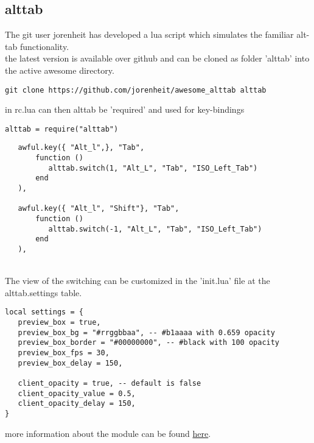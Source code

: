 \subsection{alttab}
	The git user jorenheit has developed a lua script which simulates the familiar alt-tab functionality.\\
	the latest version is available over github and can be cloned as folder 'alttab' into the active awesome directory.
	\begin{lstlisting}
git clone https://github.com/jorenheit/awesome_alttab alttab
	\end{lstlisting}
	
	\noindent in rc.lua can then alttab be 'required' and used for key-bindings
	\begin{lstlisting}
alttab = require("alttab")	
	\end{lstlisting}
	
	\begin{lstlisting}
   awful.key({ "Alt_l",}, "Tab",                                                      
       function ()                                                                              
          alttab.switch(1, "Alt_L", "Tab", "ISO_Left_Tab")                                             
       end                                                                                      
   ),                                                                                           
                                                                                                
   awful.key({ "Alt_l", "Shift"}, "Tab",                                                      
       function ()                                                                              
          alttab.switch(-1, "Alt_L", "Tab", "ISO_Left_Tab")                                            
       end                                                                                      
   ),	
	\end{lstlisting}
	
	\noindent \\The view of the switching can be customized in the 'init.lua' file at the alttab.settings table.
	\begin{lstlisting}
local settings = { 
   preview_box = true,
   preview_box_bg = "#rrggbbaa", -- #b1aaaa with 0.659 opacity
   preview_box_border = "#00000000", -- #black with 100 opacity
   preview_box_fps = 30, 
   preview_box_delay = 150,

   client_opacity = true, -- default is false
   client_opacity_value = 0.5,
   client_opacity_delay = 150,
}
	\end{lstlisting}
	
	more information about the module can be found \href{https://awesomewm.org/wiki/Familiar_Alt_Tab}{here}.
	